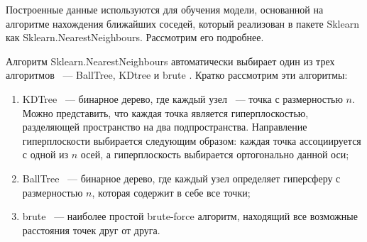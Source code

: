 \documentclass[14pt]{mmcs_article}
\begin{document}
Построенные данные используются для обучения модели, основанной на алгоритме нахождения ближайших соседей, который реализован в пакете Sklearn как Sklearn.NearestNeighbours. Рассмотрим его подробнее.

Алгоритм Sklearn.NearestNeighbours автоматически выбирает один из трех алгоритмов ~--- BallTree, KDtree и brute \cite{IP:a1}. Кратко рассмотрим эти алгоритмы:
\begin{enumerate}
	\item KDTree \cite{IP:a2} ~--- бинарное дерево, где каждый узел ~--- точка с размерностью $n$. Можно представить, что каждая точка является гиперплоскостью, разделяющей пространство на два подпространства. Направление гиперплоскости выбирается следующим образом: каждая точка ассоциируется с одной из $n$ осей, а гиперплоскость выбирается ортогонально данной оси;
	\item BallTree ~--- бинарное дерево, где каждый узел определяет гиперсферу с размерностью $n$, которая содержит в себе все точки;
	\item brute ~--- наиболее простой brute-force алгоритм, находящий все возможные расстояния точек друг от друга.
\end{enumerate}
\end{document}
